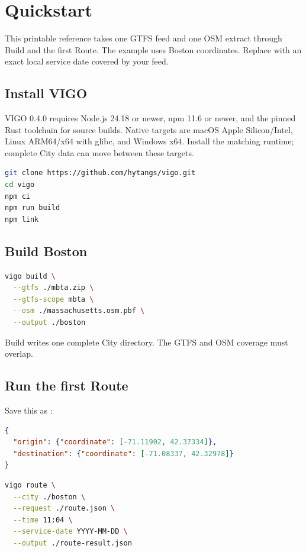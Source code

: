 \documentclass[10pt,letterpaper]{article}
\begin{document}
\guideheader

\section{Quickstart}

This printable reference takes one GTFS feed and one OSM extract through Build and the first Route. The example uses Boston coordinates. Replace  with an exact local service date covered by your feed.

\subsection{Install VIGO}

VIGO 0.4.0 requires Node.js 24.18 or newer, npm 11.6 or newer, and the pinned Rust toolchain for source builds. Native targets are macOS Apple Silicon/Intel, Linux ARM64/x64 with glibc, and Windows x64. Install the matching runtime; complete City data can move between these targets.

\begin{lstlisting}[language=bash]
git clone https://github.com/hytangs/vigo.git
cd vigo
npm ci
npm run build
npm link
\end{lstlisting}

\subsection{Build Boston}

\begin{lstlisting}[language=bash]
vigo build \
  --gtfs ./mbta.zip \
  --gtfs-scope mbta \
  --osm ./massachusetts.osm.pbf \
  --output ./boston
\end{lstlisting}

Build writes one complete City directory. The GTFS and OSM coverage must overlap.

\subsection{Run the first Route}

Save this as \code{route.json}:

\begin{lstlisting}[language=json]
{
  "origin": {"coordinate": [-71.11902, 42.37334]},
  "destination": {"coordinate": [-71.08337, 42.32978]}
}
\end{lstlisting}

\begin{lstlisting}[language=bash]
vigo route \
  --city ./boston \
  --request ./route.json \
  --time 11:04 \
  --service-date YYYY-MM-DD \
  --output ./route-result.json
\end{lstlisting}
\end{document}
